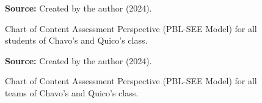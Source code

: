 \begin{figure}[ht!]
\centering

\caption{\textmd{Chart of Content Assessment Perspective (\acrshort{PBL-SEE} Model) for all students of Chavo's and Quico's class.}}
\label{fig:pbl-see_content_general}

\par\medskip\ABNTEXfontereduzida\selectfont\textbf{Source:} Created by the author (2024).
\end{figure}

\begin{figure}[ht!]
\centering

\caption{\textmd{Chart of Content Assessment Perspective (\acrshort{PBL-SEE} Model) for all teams of Chavo's and Quico's class.}}
\label{fig:pbl-see_content_all-teams}

\par\medskip\ABNTEXfontereduzida\selectfont\textbf{Source:} Created by the author (2024).
\end{figure}

